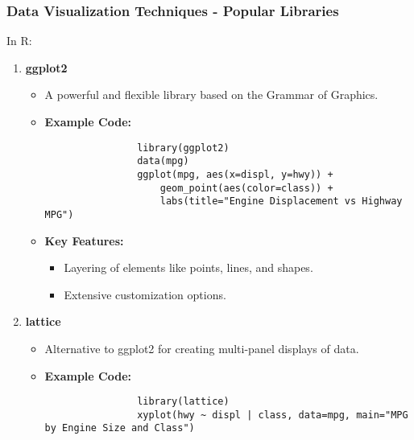 \documentclass[aspectratio=169]{beamer}
\begin{document}
\begin{frame}[fragile]
    \frametitle{Data Visualization Techniques - Popular Libraries}
    \begin{block}{In R:}
        \begin{enumerate}
            \item \textbf{ggplot2}
            \begin{itemize}
                \item A powerful and flexible library based on the Grammar of Graphics.
                \item \textbf{Example Code:}
                \begin{lstlisting}
                library(ggplot2)
                data(mpg)
                ggplot(mpg, aes(x=displ, y=hwy)) + 
                    geom_point(aes(color=class)) + 
                    labs(title="Engine Displacement vs Highway MPG")
                \end{lstlisting}
                \item \textbf{Key Features:}
                \begin{itemize}
                    \item Layering of elements like points, lines, and shapes.
                    \item Extensive customization options.
                \end{itemize}
            \end{itemize}
            \item \textbf{lattice}
            \begin{itemize}
                \item Alternative to ggplot2 for creating multi-panel displays of data.
                \item \textbf{Example Code:}
                \begin{lstlisting}
                library(lattice)
                xyplot(hwy ~ displ | class, data=mpg, main="MPG by Engine Size and Class")
                \end{lstlisting}
            \end{itemize}
        \end{enumerate}
    \end{block}
\end{frame}
\end{document}
